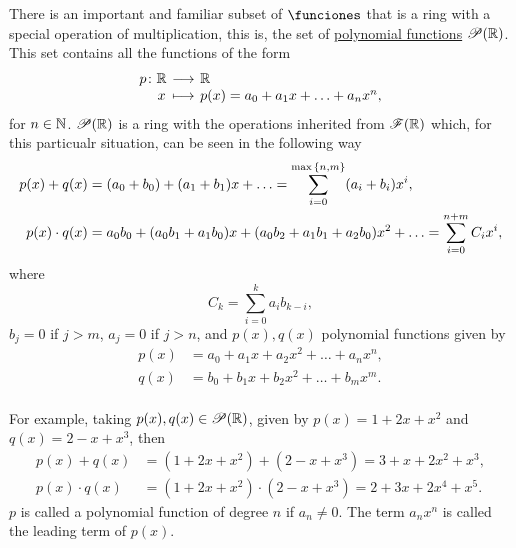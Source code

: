 \documentclass[11pt,a4paper]{article}
\begin{document}
\begin{exa}
There is an important and familiar subset of $\funciones$ that is a ring with a special operation of multiplication, this is, the set of \underline{polynomial functions} $\mathscr{P}(\mathbb{R})$. This set contains all the functions of the form
\[
\funcion{p}{\R}{\R}{x}{p(x)=a_0+a_1x+\ldots+a_nx^n,}
\]
for $n\in\mathbb{N}$. $\mathscr{P}(\mathbb{R})$ is a ring with the operations inherited from  $\mathscr{F}(\mathbb{R})$ which, for this particualr situation, can be seen in the following way
\begin{align*}
    p(x)+q(x)&= (a_0+b_0)+(a_1+b_1)x+\ldots=\sum_{i=0}^{\max{\left\lbrace n,m \right\rbrace}} (a_i+b_i)x^i,\\
    p(x)\cdot q(x)&= a_0b_0+(a_0b_1+a_1b_0)x+(a_0b_2+a_1b_1+a_2b_0)x^2+\ldots=\sum_{i=0}^{n+m} C_i x^i,
\end{align*}
where \[C_k=\sum_{i=0}^{k} a_ib_{k-i},\]  $b_j=0$ if $j> m$, $a_j=0$ if $j>n$, and $p(x),q(x)$ polynomial functions given by
\begin{align*}
p(x)&=a_0+a_1x+a_2x^2+\ldots+a_nx^n,\\
q(x)&=b_0+b_1x+b_2x^2+\ldots+b_mx^m.\\
\end{align*}

 For example, taking $p(x),q(x)\in\mathscr{P}(\mathbb{R})$, given by  $p(x)=1+2x+x^2$ and $q(x)=2-x+x^3$, then 
\begin{align*}
    p(x)+q(x)&=(1+2x+x^2)+(2-x+x^3)=3+x+2x^2+x^3,\\
    p(x)\cdot q(x)&=(1+2x+x^2)\cdot(2-x+x^3)= 2+3x+2x^4+x^5.
\end{align*}
$p$ is called a polynomial function of degree $n$ if $a_n\neq 0$. The term $a_nx^n$ is called the leading term of $p(x).$

\end{exa}
\end{document}
